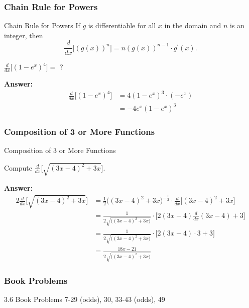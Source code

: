 \documentclass[cal1spr16Lectures.tex]{subfiles}
\begin{document}
\subsubsection{Chain Rule for Powers}

\begin{frame}[allowframebreaks]{\small Chain Rule for Powers}
If $g$ is differentiable for all $x$ in the domain and $n$ is an integer, then
\[\frac{d}{dx} \bigg[\left(g(x)\right)^n \bigg]=n(g(x))^{n-1} \cdot g^{\prime}(x).\]

\framebreak
\begin{ex} $\frac{d}{dx} \bigg[ (1-e^x)^4 \bigg] =$ ? \end{ex}
{\bf Answer:}
\begin{align*}
\frac{d}{dx} \bigg[ (1-e^x)^4 \bigg] &= 4(1-e^x)^3 \cdot (-e^x) \\
 &= -4e^x (1-e^x)^3
\end{align*}
\end{frame}

\subsubsection{Composition of 3 or More Functions}

\begin{frame}[allowframebreaks]{\small Composition of 3 or More Functions}
\begin{ex}Compute $\frac{d}{dx} \bigg[ \sqrt{(3x-4)^2 + 3x} \bigg]$. \end{ex}

\framebreak\footnotesize
{\bf Answer:}
\begin{alignat*}{2}
\frac{d}{dx} \bigg[ \sqrt{(3x-4)^2 + 3x} \bigg] &= \frac{1}{2} \big( (3x-4)^2 + 3x \big)^{-\frac{1}{2}} \cdot \frac{d}{dx} \big[ (3x-4)^2 + 3x \big] \\
&= \frac{1}{2 \sqrt{ \big( (3x-4)^2 + 3x \big)}} \cdot \bigg[ 2(3x-4) \frac{d}{dx}(3x-4)  + 3 \bigg] \\
&= \frac{1}{2 \sqrt{ \big( (3x-4)^2 + 3x \big)}} \cdot \big[ 2(3x-4) \cdot 3 + 3 \big] \\
&= \frac{18x-21}{2 \sqrt{ \big( (3x-4)^2 + 3x \big)}} 
\end{alignat*}
\end{frame}

\subsubsection{Book Problems}

\begin{frame}
\begin{block}{3.6 Book Problems} 7-29 (odds), 30, 33-43 (odds), 49 \end{block} 
\end{frame}
\end{document}
